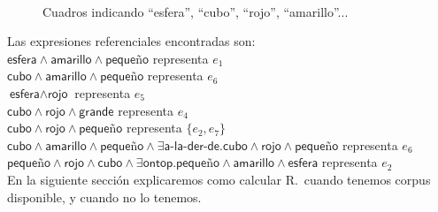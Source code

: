 \begin{figure}[ht]
\begin{center}
\\[0pt]
\caption{Cuadros indicando ``esfera'', ``cubo'', ``rojo'', ``amarillo''...}
\label{fig-modelo17}
\end{center}
\end{figure}

Las expresiones referenciales encontradas son:\\

$\textsf{esfera} \wedge \textsf{amarillo} \wedge \textsf{peque\~no}$ representa $e_1$ \\
$\textsf{cubo} \wedge \textsf{amarillo} \wedge \textsf{peque\~no}$ representa $e_6$ \\
$\textsf{esfera} \wedge \textsf{rojo}$ representa $e_5$ \\
$\textsf{cubo} \wedge \textsf{rojo} \wedge \textsf{grande}$ representa $e_4$ \\
$\textsf{cubo} \wedge \textsf{rojo} \wedge \textsf{peque\~no}$ representa $\{e_2,e_7\}$  \\
$\textsf{cubo} \wedge \textsf{amarillo} \wedge \textsf{peque\~no} \wedge \exists \textsf{a-la-der-de}. \textsf{cubo} \wedge \textsf{rojo} \wedge \textsf{peque\~no}$ representa $e_6$ \\
$\textsf{peque\~no} \wedge \textsf{rojo} \wedge \textsf{cubo} \wedge \exists \textsf{ontop}. \textsf{peque\~no} \wedge \textsf{amarillo} \wedge \textsf{esfera}$ representa $e_2$ \\



En la siguiente secci\'on explicaremos como calcular R.\puse\ cuando tenemos corpus disponible, y cuando no lo tenemos.



